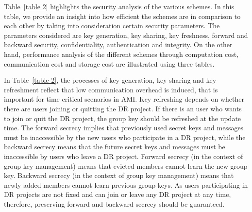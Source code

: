 \par Table~\ref{table 2} highlights the security analysis of the various schemes. In this table, we provide an insight into how efficient the schemes are in comparison to each other by taking into consideration certain security parameters. The parameters considered are key generation, key sharing, key freshness, forward and backward security, confidentiality, authentication and integrity. On the other hand, performance analysis of the different schemes through computation cost, communication cost and storage cost are illustrated using three tables. 

In Table~\ref{table 2}, the processes of key generation, key sharing and key refreshment reflect that low communication overhead is induced, that is important for time critical scenarios in AMI. Key refreshing depends on whether there are users joining or quitting the DR project. If there is an user who wants to join or quit the DR project, the group key should be refreshed at the update time. The forward secrecy implies that previously used secret keys and messages must be inaccessible by the new users who participate in a DR project, while the backward secrecy means that the future secret keys and messages must be inaccessible by users who leave a DR project. Forward secrecy (in the context of group key management) means that evicted members cannot learn the new group key. Backward secrecy (in the context of group key management) means that newly added members cannot learn previous group keys. As users participating in DR projects are not fixed and can join or leave any DR project at any time, therefore, preserving forward and backward secrecy should be guaranteed. 

